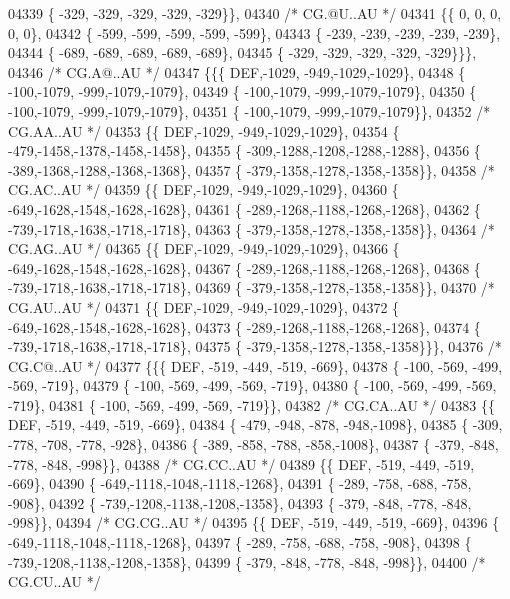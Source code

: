 \begin{DoxyCode}
04339 \{ -329, -329, -329, -329, -329\}\},
04340 \textcolor{comment}{/* CG.@U..AU */}
04341 \{\{    0,    0,    0,    0,    0\},
04342 \{ -599, -599, -599, -599, -599\},
04343 \{ -239, -239, -239, -239, -239\},
04344 \{ -689, -689, -689, -689, -689\},
04345 \{ -329, -329, -329, -329, -329\}\}\},
04346 \textcolor{comment}{/* CG.A@..AU */}
04347 \{\{\{  DEF,-1029, -949,-1029,-1029\},
04348 \{ -100,-1079, -999,-1079,-1079\},
04349 \{ -100,-1079, -999,-1079,-1079\},
04350 \{ -100,-1079, -999,-1079,-1079\},
04351 \{ -100,-1079, -999,-1079,-1079\}\},
04352 \textcolor{comment}{/* CG.AA..AU */}
04353 \{\{  DEF,-1029, -949,-1029,-1029\},
04354 \{ -479,-1458,-1378,-1458,-1458\},
04355 \{ -309,-1288,-1208,-1288,-1288\},
04356 \{ -389,-1368,-1288,-1368,-1368\},
04357 \{ -379,-1358,-1278,-1358,-1358\}\},
04358 \textcolor{comment}{/* CG.AC..AU */}
04359 \{\{  DEF,-1029, -949,-1029,-1029\},
04360 \{ -649,-1628,-1548,-1628,-1628\},
04361 \{ -289,-1268,-1188,-1268,-1268\},
04362 \{ -739,-1718,-1638,-1718,-1718\},
04363 \{ -379,-1358,-1278,-1358,-1358\}\},
04364 \textcolor{comment}{/* CG.AG..AU */}
04365 \{\{  DEF,-1029, -949,-1029,-1029\},
04366 \{ -649,-1628,-1548,-1628,-1628\},
04367 \{ -289,-1268,-1188,-1268,-1268\},
04368 \{ -739,-1718,-1638,-1718,-1718\},
04369 \{ -379,-1358,-1278,-1358,-1358\}\},
04370 \textcolor{comment}{/* CG.AU..AU */}
04371 \{\{  DEF,-1029, -949,-1029,-1029\},
04372 \{ -649,-1628,-1548,-1628,-1628\},
04373 \{ -289,-1268,-1188,-1268,-1268\},
04374 \{ -739,-1718,-1638,-1718,-1718\},
04375 \{ -379,-1358,-1278,-1358,-1358\}\}\},
04376 \textcolor{comment}{/* CG.C@..AU */}
04377 \{\{\{  DEF, -519, -449, -519, -669\},
04378 \{ -100, -569, -499, -569, -719\},
04379 \{ -100, -569, -499, -569, -719\},
04380 \{ -100, -569, -499, -569, -719\},
04381 \{ -100, -569, -499, -569, -719\}\},
04382 \textcolor{comment}{/* CG.CA..AU */}
04383 \{\{  DEF, -519, -449, -519, -669\},
04384 \{ -479, -948, -878, -948,-1098\},
04385 \{ -309, -778, -708, -778, -928\},
04386 \{ -389, -858, -788, -858,-1008\},
04387 \{ -379, -848, -778, -848, -998\}\},
04388 \textcolor{comment}{/* CG.CC..AU */}
04389 \{\{  DEF, -519, -449, -519, -669\},
04390 \{ -649,-1118,-1048,-1118,-1268\},
04391 \{ -289, -758, -688, -758, -908\},
04392 \{ -739,-1208,-1138,-1208,-1358\},
04393 \{ -379, -848, -778, -848, -998\}\},
04394 \textcolor{comment}{/* CG.CG..AU */}
04395 \{\{  DEF, -519, -449, -519, -669\},
04396 \{ -649,-1118,-1048,-1118,-1268\},
04397 \{ -289, -758, -688, -758, -908\},
04398 \{ -739,-1208,-1138,-1208,-1358\},
04399 \{ -379, -848, -778, -848, -998\}\},
04400 \textcolor{comment}{/* CG.CU..AU */}

\end{DoxyCode}
